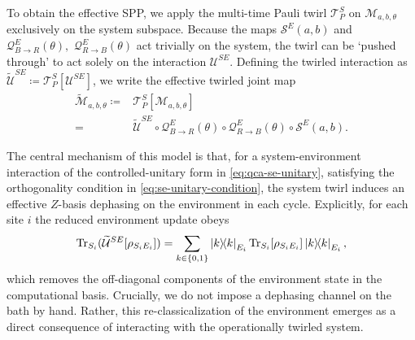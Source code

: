 \documentclass[
    aps,
    prx,
    reprint,
    superscriptaddress,
    longbibliography,
    nofootinbib,
    floatfix,
]{revtex4-2}
\newcommand{\Tr}{\mathrm{Tr}}
\newcommand{\ketbra}[2]{\ket{#1}\!\!\bra{#2}}  %
\begin{document}
To obtain the effective SPP, we apply the multi-time Pauli twirl \(\mathcal{T}_P^S\) on \(\mathcal{M}_{a, b, \theta}\) exclusively on the system subspace. Because the maps \(\mathcal{S}^E (a, b)\) and \(\mathcal{Q}_{B\to R}^E(\theta),\) \(\mathcal{Q}_{R\to B}^E(\theta)\) act trivially on the system, the twirl can be `pushed through' to act solely on the interaction \(\mathcal{U}^{SE}\). Defining the twirled interaction as \(\widetilde{\mathcal{U}}^{SE} \coloneq \mathcal{T}_P^S[\mathcal{U}^{SE}]\), we write the effective twirled joint map
\begin{equation}
    \begin{aligned}
        \widetilde{\mathcal{M}}_{a, b, \theta} 
        \coloneq &
        \mathcal{T}_P^S[\mathcal{M}_{a, b, \theta}]
        \\
        = &
        \widetilde{\mathcal{U}}^{SE} \circ \mathcal{Q}_{B\to R}^E(\theta) \circ \mathcal{Q}_{R\to B}^E(\theta) \circ \mathcal{S}^E (a, b).
    \end{aligned}
\end{equation}

The central mechanism of this model is that, for a system-environment interaction of the controlled-unitary form in \cref{eq:qca-se-unitary}, satisfying the orthogonality condition in \cref{eq:se-unitary-condition}, the system twirl induces an effective \(Z\)-basis dephasing on the environment in each cycle. Explicitly, for each site \(i\) the reduced environment update obeys
\begin{equation}\label{eq:reduced-environment-update}
    \Tr_{S_i}(\widetilde{\mathcal{U}}^{SE}[\rho_{S_iE_i}]) = \sum_{k\in\{0,1\}} \ketbra{k}{k}_{E_i} \Tr_{S_i}[\rho_{S_iE_i}] \ketbra{k}{k}_{E_i},
\end{equation}
which removes the off-diagonal components of the environment state in the computational basis. Crucially, we do not impose a dephasing channel on the bath by hand. Rather, this re-classicalization of the environment emerges as a direct consequence of interacting with the operationally twirled system.
\end{document}
